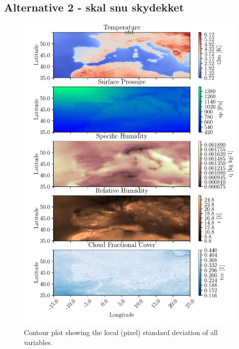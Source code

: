 \subsection{Alternative 2 - skal snu skydekket}
\begin{figure}[ht]
    \centering
    \includegraphics{python_figs/contourplot_all_variables_std.pdf}
    \caption{Contour plot showing the local (pixel) standard deviation of all variables.}
    \label{fig:contour_std_all_vars}
\end{figure}

